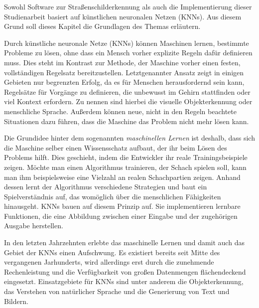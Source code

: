 \label{chap:KNNs}

Sowohl Software zur Straßenschilderkennung als auch die Implementierung dieser Studienarbeit basiert auf künstlichen neuronalen Netzen (\acsp{KNN}). Aus diesem Grund soll dieses Kapitel die Grundlagen des Themas erläutern.

Durch künstliche neuronale Netze (\acsp{KNN}) können Maschinen lernen, bestimmte Probleme zu lösen, ohne dass ein Mensch vorher explizite Regeln dafür definieren muss. Dies steht im Kontrast zur Methode, der Maschine  vorher einen festen, vollständigen Regelsatz bereitzustellen. Letztgenannter Ansatz zeigt in einigen Gebieten nur begrenzten Erfolg, da es für Menschen herausfordernd sein kann, Regelsätze für Vorgänge zu definieren, die unbewusst im Gehirn stattfinden oder viel Kontext erfordern. Zu nennen sind hierbei die visuelle Objekterkennung oder menschliche Sprache. Außerdem können neue, nicht in den Regeln beachtete Situationen dazu führen, dass die Maschine das Problem nicht mehr lösen kann. \cite{DeepLearningBook}

Die Grundidee hinter dem sogenannten \emph{maschinellen Lernen} ist deshalb, dass sich die Maschine selber einen Wissensschatz aufbaut, der ihr beim Lösen des Problems hilft. Dies geschieht, indem die Entwickler ihr reale Trainingsbeispiele zeigen. Möchte man einen Algorithmus trainieren, der Schach spielen soll, kann man ihm beispielsweise eine Vielzahl an realen Schachpartien zeigen. Anhand dessen lernt der Algorithmus verschiedene Strategien und baut ein Spielverständnis auf, das womöglich über die menschlichen Fähigkeiten hinausgeht. \acp{KNN} bauen auf diesem Prinzip auf. Sie implementieren lernbare Funktionen, die eine Abbildung zwischen einer Eingabe und der zugehörigen Ausgabe herstellen. \cite{DeepLearningBook}

In den letzten Jahrzehnten erlebte das maschinelle Lernen und damit auch das Gebiet der \acp{KNN} einen Aufschwung. Es existiert bereits seit Mitte des vergangenen Jarhunderts, wird allerdings erst durch die zunehmende Rechenleistung und die Verfügbarkeit von großen Datenmengen flächendeckend eingesetzt. Einsatzgebiete für \acp{KNN} sind unter anderem die Objekterkennung, das Verstehen von natürlicher Sprache und die Generierung von Text und Bildern. \cite{knnsKompakt}

